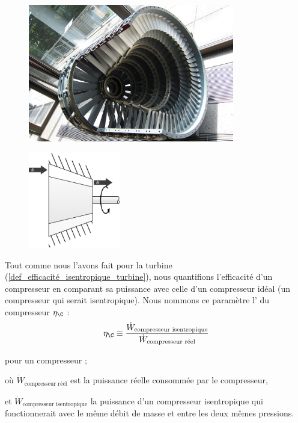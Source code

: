		\begin{figure}
			\begin{center}
				\includegraphics[width=9cm]{images/photo_compresseur.jpg}
			\end{center}
			\label{fig_schéma_compresseur1}
		\end{figure}

		\begin{figure}
			\begin{center}
				\includegraphics[width=4cm]{images/symbole_compresseur.png}
			\end{center}
			\label{fig_schéma_compresseur2}
		\end{figure}

		Tout comme nous l’avons fait pour la turbine (\ref{def_efficacité_isentropique_turbine}), nous quantifions l’efficacité d’un compresseur en comparant sa puissance avec celle d’un compresseur idéal (un compresseur qui serait isentropique). Nous nommons ce paramètre l’ du compresseur $\eta_\C$ :
		\begin{equation}
			\eta_\C \equiv \frac{\dot W_\text{compresseur isentropique}}{\dot W_\text{compresseur réel}}
			\label{def_efficacité_isentropique_compresseur}
		\end{equation}
		\begin{equationterms}
			\item pour un compresseur ;
			\item où \tab $\dot W_\text{compresseur réel}$ \tab\tab\tab est la puissance réelle consommée par le compresseur,
			\item et \tab $\dot W_\text{compresseur isentropique}$ \tab la puissance d’un compresseur isentropique qui fonctionnerait avec le même débit de masse et entre les deux mêmes pressions.
		\end{equationterms}

